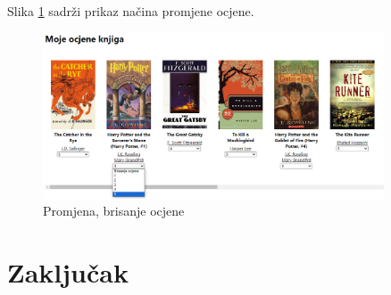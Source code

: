 \documentclass[]{foi}
\begin{document}
Slika \ref{fig:promjena_ocjene} sadrži prikaz načina promjene ocjene.

\begin{figure}[h!]
	\centering
	\includegraphics[width=0.9\textwidth]{slike/promjena_ocjene.png}
	\caption{Promjena, brisanje ocjene}
	\label{fig:promjena_ocjene}
\end{figure}

\chapter{Zaključak}

\makebackmatter
\end{document}
